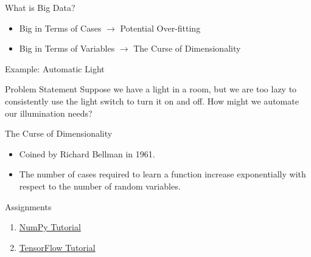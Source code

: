 \documentclass[handout]{beamer}
\begin{document}
\begin{frame}{What is Big Data?}
    \begin{itemize}
        \item Big in Terms of Cases $\longrightarrow$ Potential Over-fitting
        \item Big in Terms of Variables $\longrightarrow$ The Curse of Dimensionality
    \end{itemize}
\end{frame}

\begin{frame}{Example: Automatic Light}
    \begin{block}{Problem Statement}
        Suppose we have a light in a room, but we are too lazy to consistently use the light switch to turn it on and off.
        How might we automate our illumination needs?
    \end{block}
\end{frame}

\begin{frame}{The Curse of Dimensionality}
    \begin{itemize}
        \item Coined by Richard Bellman in 1961.
        \item The number of cases required to learn a function increase exponentially with respect to the number of random variables.
    \end{itemize}
\end{frame}

\begin{frame}{Assignments}
    \begin{enumerate}
        \item \href{https://semo.instructure.com/courses/8742/assignments/82078}{NumPy Tutorial}
        \item \href{https://semo.instructure.com/courses/8742/assignments/82079}{TensorFlow Tutorial}
    \end{enumerate}
\end{frame}
\end{document}
